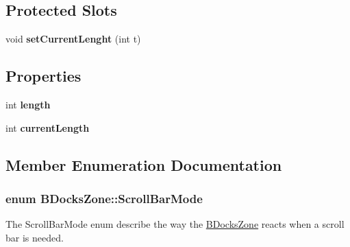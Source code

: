 \subsection*{\-Protected \-Slots}
\begin{DoxyCompactItemize}
\item 
\hypertarget{class_b_docks_zone_ade5e2f8579546a8355b5c75befe842f5}{void {\bfseries set\-Current\-Lenght} (int t)}\label{class_b_docks_zone_ade5e2f8579546a8355b5c75befe842f5}

\end{DoxyCompactItemize}
\subsection*{\-Properties}
\begin{DoxyCompactItemize}
\item 
\hypertarget{class_b_docks_zone_a26430cbbe5912630ebeb2ff92163e659}{int {\bfseries length}}\label{class_b_docks_zone_a26430cbbe5912630ebeb2ff92163e659}

\item 
\hypertarget{class_b_docks_zone_a3ba97d259ca964bebff21ff657038e29}{int {\bfseries current\-Length}}\label{class_b_docks_zone_a3ba97d259ca964bebff21ff657038e29}

\end{DoxyCompactItemize}


\subsection{\-Member \-Enumeration \-Documentation}
\hypertarget{class_b_docks_zone_aaa04c632b39dce77b61a3a28b7418fdd}{
\subsubsection[{\-Scroll\-Bar\-Mode}]{\setlength{\rightskip}{0pt plus 5cm}enum {\bf \-B\-Docks\-Zone\-::\-Scroll\-Bar\-Mode}}}\label{class_b_docks_zone_aaa04c632b39dce77b61a3a28b7418fdd}


\-The \-Scroll\-Bar\-Mode enum describe the way the \hyperlink{class_b_docks_zone}{\-B\-Docks\-Zone} reacts when a scroll bar is needed. 

